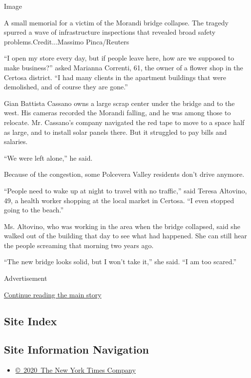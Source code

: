 Image

A small memorial for a victim of the Morandi bridge collapse. The
tragedy spurred a wave of infrastructure inspections that revealed broad
safety problems.Credit...Massimo Pinca/Reuters

``I open my store every day, but if people leave here, how are we
supposed to make business?'' asked Marianna Correnti, 61, the owner of a
flower shop in the Certosa district. ``I had many clients in the
apartment buildings that were demolished, and of course they are gone.''

Gian Battista Cassano owns a large scrap center under the bridge and to
the west. His cameras recorded the Morandi falling, and he was among
those to relocate. Mr. Cassano's company navigated the red tape to move
to a space half as large, and to install solar panels there. But it
struggled to pay bills and salaries.

``We were left alone,'' he said.

Because of the congestion, some Polcevera Valley residents don't drive
anymore.

``People need to wake up at night to travel with no traffic,'' said
Teresa Altovino, 49, a health worker shopping at the local market in
Certosa. ``I even stopped going to the beach.''

Ms. Altovino, who was working in the area when the bridge collapsed,
said she walked out of the building that day to see what had happened.
She can still hear the people screaming that morning two years ago.

``The new bridge looks solid, but I won't take it,'' she said. ``I am
too scared.''

Advertisement

\protect\hyperlink{after-bottom}{Continue reading the main story}

\hypertarget{site-index}{%
\subsection{Site Index}\label{site-index}}

\hypertarget{site-information-navigation}{%
\subsection{Site Information
Navigation}\label{site-information-navigation}}

\begin{itemize}
\tightlist
\item
  \href{https://help.nytimes.com/hc/en-us/articles/115014792127-Copyright-notice}{©~2020~The
  New York Times Company}
\end{itemize}

